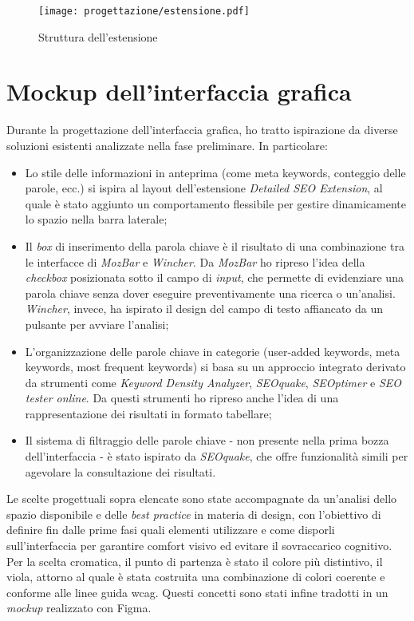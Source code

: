 \begin{figure}[H]
  \centering 
  \texttt{[image: progettazione/estensione.pdf]}
  \caption{Struttura dell'estensione}
\end{figure}

\section{Mockup dell'interfaccia grafica}
\label{sec:mockup}

\par Durante la progettazione dell’interfaccia grafica, ho tratto ispirazione da diverse soluzioni esistenti analizzate nella fase preliminare. In particolare:
\begin{itemize}
    \item Lo stile delle informazioni in anteprima (come meta keywords, conteggio delle parole, ecc.) si ispira al layout dell’estensione \textit{Detailed SEO Extension}, al quale è stato aggiunto un comportamento flessibile per gestire dinamicamente lo spazio nella barra laterale;
    \item Il \textit{box} di inserimento della parola chiave è il risultato di una combinazione tra le interfacce di \textit{MozBar} e \textit{Wincher}. Da \textit{MozBar} ho ripreso l’idea della \textit{checkbox} posizionata sotto il campo di \textit{input}, che permette di evidenziare una parola chiave senza dover eseguire preventivamente una ricerca o un’analisi. \textit{Wincher}, invece, ha ispirato il design del campo di testo affiancato da un pulsante per avviare l’analisi;
    \item L’organizzazione delle parole chiave in categorie (user-added keywords, meta keywords, most frequent keywords) si basa su un approccio integrato derivato da strumenti come \textit{Keyword Density Analyzer}, \textit{SEOquake}, \textit{SEOptimer} e \textit{SEO tester online}. Da questi strumenti ho ripreso anche l’idea di una rappresentazione dei risultati in formato tabellare;
    \item Il sistema di filtraggio delle parole chiave - non presente nella prima bozza dell’interfaccia - è stato ispirato da \textit{SEOquake}, che offre funzionalità simili per agevolare la consultazione dei risultati.
\end{itemize}

\vspace{5pt}
\par\noindent Le scelte progettuali sopra elencate sono state accompagnate da un’analisi dello spazio disponibile e delle \textit{best practice} in materia di design, con l’obiettivo di definire fin dalle prime fasi quali elementi utilizzare e come disporli sull’interfaccia per garantire comfort visivo ed evitare il sovraccarico cognitivo. Per la scelta cromatica, il punto di partenza è stato il colore più distintivo, il viola, attorno al quale è stata costruita una combinazione di colori coerente e conforme alle linee guida \gls{wcag}. Questi concetti sono stati infine tradotti in un \textit{mockup} realizzato con Figma.

